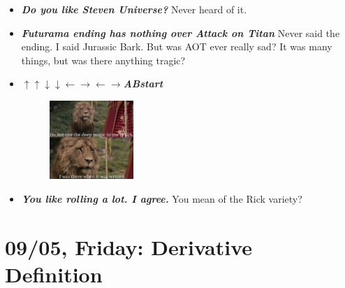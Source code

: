 \documentclass[11pt,letterpaper]{article}
\begin{document}
\begin{itemize}
\item {\bfseries\itshape Do you like Steven Universe?} Never heard of it.

\item {\bfseries\itshape Futurama ending has nothing over Attack on Titan} Never said the ending. I said Jurassic Bark. But was AOT ever really sad? It was many things, but was there anything tragic?

\item {\bfseries\itshape $\uparrow\uparrow\downarrow\downarrow\leftarrow\rightarrow\leftarrow\rightarrow$ABstart} 
	\begin{figure}[H]
	\centering
	\includegraphics[width=0.30\textwidth]{images/magic.png}
	\end{figure}

\item {\bfseries\itshape You like rolling a lot. I agree.} You mean of the Rick variety? 

\end{itemize}

\newpage
\section*{09/05, Friday: Derivative Definition\label{09-05}}
\end{document}
